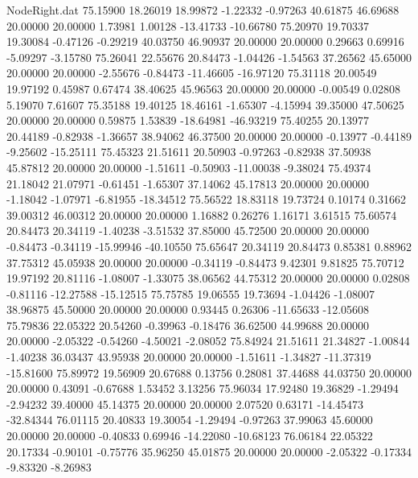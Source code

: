 \begin{filecontents}{NodeRight.dat}
  75.15900   18.26019   18.99872    -1.22332   -0.97263   40.61875   46.69688   20.00000   20.00000    1.73981    1.00128  -13.41733  -10.66780
  75.20970   19.70337   19.30084    -0.47126   -0.29219   40.03750   46.90937   20.00000   20.00000    0.29663    0.69916   -5.09297   -3.15780
  75.26041   22.55676   20.84473    -1.04426   -1.54563   37.26562   45.65000   20.00000   20.00000   -2.55676   -0.84473  -11.46605  -16.97120
  75.31118   20.00549   19.97192     0.45987    0.67474   38.40625   45.96563   20.00000   20.00000   -0.00549    0.02808    5.19070    7.61607
  75.35188   19.40125   18.46161    -1.65307   -4.15994   39.35000   47.50625   20.00000   20.00000    0.59875    1.53839  -18.64981  -46.93219
  75.40255   20.13977   20.44189    -0.82938   -1.36657   38.94062   46.37500   20.00000   20.00000   -0.13977   -0.44189   -9.25602  -15.25111
  75.45323   21.51611   20.50903    -0.97263   -0.82938   37.50938   45.87812   20.00000   20.00000   -1.51611   -0.50903  -11.00038   -9.38024
  75.49374   21.18042   21.07971    -0.61451   -1.65307   37.14062   45.17813   20.00000   20.00000   -1.18042   -1.07971   -6.81955  -18.34512
  75.56522   18.83118   19.73724     0.10174    0.31662   39.00312   46.00312   20.00000   20.00000    1.16882    0.26276    1.16171    3.61515
  75.60574   20.84473   20.34119    -1.40238   -3.51532   37.85000   45.72500   20.00000   20.00000   -0.84473   -0.34119  -15.99946  -40.10550
  75.65647   20.34119   20.84473     0.85381    0.88962   37.75312   45.05938   20.00000   20.00000   -0.34119   -0.84473    9.42301    9.81825
  75.70712   19.97192   20.81116    -1.08007   -1.33075   38.06562   44.75312   20.00000   20.00000    0.02808   -0.81116  -12.27588  -15.12515
  75.75785   19.06555   19.73694    -1.04426   -1.08007   38.96875   45.50000   20.00000   20.00000    0.93445    0.26306  -11.65633  -12.05608
  75.79836   22.05322   20.54260    -0.39963   -0.18476   36.62500   44.99688   20.00000   20.00000   -2.05322   -0.54260   -4.50021   -2.08052
  75.84924   21.51611   21.34827    -1.00844   -1.40238   36.03437   43.95938   20.00000   20.00000   -1.51611   -1.34827  -11.37319  -15.81600
  75.89972   19.56909   20.67688     0.13756    0.28081   37.44688   44.03750   20.00000   20.00000    0.43091   -0.67688    1.53452    3.13256
  75.96034   17.92480   19.36829    -1.29494   -2.94232   39.40000   45.14375   20.00000   20.00000    2.07520    0.63171  -14.45473  -32.84344
  76.01115   20.40833   19.30054    -1.29494   -0.97263   37.99063   45.60000   20.00000   20.00000   -0.40833    0.69946  -14.22080  -10.68123
  76.06184   22.05322   20.17334    -0.90101   -0.75776   35.96250   45.01875   20.00000   20.00000   -2.05322   -0.17334   -9.83320   -8.26983

\end{filecontents}
